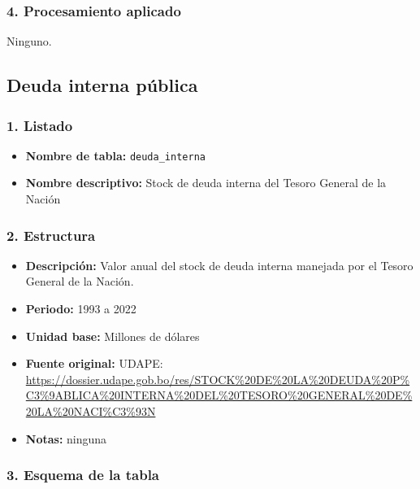 \documentclass[12pt,a4paper]{article}
\begin{document}
\subsubsection*{4. Procesamiento aplicado}
Ninguno.

\subsection{Deuda interna pública}

\subsubsection*{1. Listado}
\begin{itemize}
  \item \textbf{Nombre de tabla:} \texttt{deuda\_interna}
  \item \textbf{Nombre descriptivo:} Stock de deuda interna del Tesoro General de la Nación
\end{itemize}

\subsubsection*{2. Estructura}
\begin{itemize}
  \item \textbf{Descripción:} Valor anual del stock de deuda interna manejada por el Tesoro General de la Nación.
  \item \textbf{Periodo:} 1993 a 2022
  \item \textbf{Unidad base:} Millones de dólares
  \item \textbf{Fuente original:} UDAPE:\\
    \url{https://dossier.udape.gob.bo/res/STOCK%20DE%20LA%20DEUDA%20P%C3%9ABLICA%20INTERNA%20DEL%20TESORO%20GENERAL%20DE%20LA%20NACI%C3%93N}
  \item \textbf{Notas:} ninguna
\end{itemize}

\subsubsection*{3. Esquema de la tabla}
\end{document}
